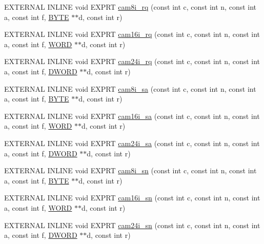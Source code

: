 \begin{DoxyCompactItemize}
EXTERNAL INLINE void EXPRT \hyperlink{group__mcstdfunctionh_ga0b43ea9b407515f2cd75fb68f0d07e39}{cam8i\_\-rq} (const int c, const int n, const int a, const int f, \hyperlink{vt2_8h_a4ae1dab0fb4b072a66584546209e7d58}{BYTE} $\ast$$\ast$d, const int r)
\item 
EXTERNAL INLINE void EXPRT \hyperlink{group__mcstdfunctionh_ga4a234b702b8b906b0cca1bcbdb01ca27}{cam16i\_\-rq} (const int c, const int n, const int a, const int f, \hyperlink{vt2_8h_a2b0e863dadf920709ec53d9088ee7c91}{WORD} $\ast$$\ast$d, const int r)
\item 
EXTERNAL INLINE void EXPRT \hyperlink{group__mcstdfunctionh_ga6a2d5a0785b2ccc27fc9e2769f749b10}{cam24i\_\-rq} (const int c, const int n, const int a, const int f, \hyperlink{vt2_8h_a798af1e30bc65f319c1a246cecf59e39}{DWORD} $\ast$$\ast$d, const int r)
\item 
EXTERNAL INLINE void EXPRT \hyperlink{group__mcstdfunctionh_gaf214e0cb1cc8859f5176781a3dceaf31}{cam8i\_\-sa} (const int c, const int n, const int a, const int f, \hyperlink{vt2_8h_a4ae1dab0fb4b072a66584546209e7d58}{BYTE} $\ast$$\ast$d, const int r)
\item 
EXTERNAL INLINE void EXPRT \hyperlink{group__mcstdfunctionh_ga2486ffaca1f0a3bef21952140957febe}{cam16i\_\-sa} (const int c, const int n, const int a, const int f, \hyperlink{vt2_8h_a2b0e863dadf920709ec53d9088ee7c91}{WORD} $\ast$$\ast$d, const int r)
\item 
EXTERNAL INLINE void EXPRT \hyperlink{group__mcstdfunctionh_ga77a1df9e51c7cd35efb9575e48fac6b2}{cam24i\_\-sa} (const int c, const int n, const int a, const int f, \hyperlink{vt2_8h_a798af1e30bc65f319c1a246cecf59e39}{DWORD} $\ast$$\ast$d, const int r)
\item 
EXTERNAL INLINE void EXPRT \hyperlink{group__mcstdfunctionh_ga59eb2f93b82ddfd86523a3a65988f238}{cam8i\_\-sn} (const int c, const int n, const int a, const int f, \hyperlink{vt2_8h_a4ae1dab0fb4b072a66584546209e7d58}{BYTE} $\ast$$\ast$d, const int r)
\item 
EXTERNAL INLINE void EXPRT \hyperlink{group__mcstdfunctionh_gad17ca468489b8b10bb9317a72d139a05}{cam16i\_\-sn} (const int c, const int n, const int a, const int f, \hyperlink{vt2_8h_a2b0e863dadf920709ec53d9088ee7c91}{WORD} $\ast$$\ast$d, const int r)
\item 
EXTERNAL INLINE void EXPRT \hyperlink{group__mcstdfunctionh_gaeca899e6d3a4fd8992f3556fe0f78038}{cam24i\_\-sn} (const int c, const int n, const int a, const int f, \hyperlink{vt2_8h_a798af1e30bc65f319c1a246cecf59e39}{DWORD} $\ast$$\ast$d, const int r)
$$
\end{DoxyCompactItemize}
